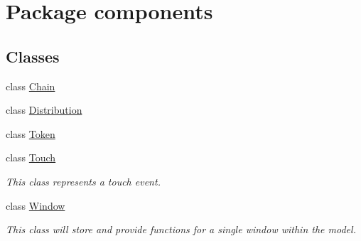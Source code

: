 \hypertarget{namespacecomponents}{}\section{Package components}
\label{namespacecomponents}
\subsection*{Classes}
\begin{DoxyCompactItemize}
\item 
class \hyperlink{classcomponents_1_1_chain}{Chain}
\item 
class \hyperlink{classcomponents_1_1_distribution}{Distribution}
\item 
class \hyperlink{classcomponents_1_1_token}{Token}
\item 
class \hyperlink{classcomponents_1_1_touch}{Touch}
\begin{DoxyCompactList}\small\item\em This class represents a touch event. \end{DoxyCompactList}\item 
class \hyperlink{classcomponents_1_1_window}{Window}
\begin{DoxyCompactList}\small\item\em This class will store and provide functions for a single window within the model. \end{DoxyCompactList}\end{DoxyCompactItemize}
